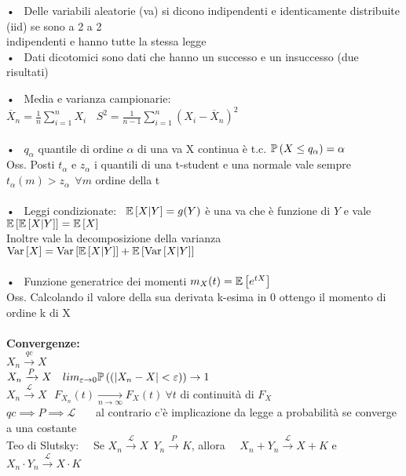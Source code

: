 

• \ Delle variabili aleatorie (va) si dicono indipendenti e identicamente distribuite (iid) se sono a 2 a 2\\ indipendenti e hanno tutte la stessa legge\\

• \ Dati dicotomici sono dati che hanno un successo e un insuccesso (due risultati)\\




• \ Media e varianza campionarie: \ \ $\overline{X}_n=\frac{1}{n} \displaystyle \sum_{i=1}^n X_i \ \ \ \ S^2=\frac{1}{n-1}\sum_{i=1}^n(X_i-\overline{X}_n)^2$\\ \\

• \ $q_{\alpha}$ quantile di ordine $\alpha$ di una va X continua è t.c. $\mathbb{P} \left( X\le q_{\alpha} \right)=\alpha$\\
Oss. Posti $t_{\alpha}$ e $z_{\alpha}$ i quantili di una t-student e una normale vale sempre \  $t_{\alpha}(m)>z_{\alpha}\ \ \forall m$ ordine della t\\ \\

• \ Leggi condizionate: \ $\mathbb{E} \left[ X|Y \right]=g(Y)$ è una va che è funzione di $Y$ e vale $\mathbb{E} \left[ \mathbb{E} \left[ X|Y \right] \right]=\mathbb{E} \left[ X \right]$\\
Inoltre vale la decomposizione della varianza $\text{Var} \left[ X \right]=\text{Var} \left[ \mathbb{E} \left[ X|Y \right] \right]+\mathbb{E} \left[ \text{Var} \left[ X|Y \right] \right]$\\ \\

• \ Funzione generatrice dei momenti $m_X(t)=\mathbb{E} \left[ e^{tX} \right]$\\
Oss. Calcolando il valore della sua derivata k-esima in 0 ottengo il momento di ordine k di X\\ \\

\textbf{Convergenze:}\\
$X_n\xrightarrow{qc} X$\\
$X_n\xrightarrow{P}X \ \ \ lim_{\varepsilon \to 0} \mathbb{P} \left( (|X_n-X|<\varepsilon) \right)\to 1$\\
$X_n\xrightarrow{\mathcal{L}}X \ \ \ F_{X_n}(t)\xrightarrow[n\to\infty]{} F_X(t) \ \forall t$ di continuità di $F_X$\\
$qc \implies P \implies \mathcal{L}$ \ \ \ al contrario c'è implicazione da legge a probabilità se converge a una costante\\

Teo di Slutsky: \ \ Se $X_n\xrightarrow{\mathcal{L}}X \ \ Y_n\xrightarrow{P}K$, allora \ \ $X_n + Y_n \xrightarrow{\mathcal{L}}X+K$ e \ \ $X_n\cdot Y_n\xrightarrow{\mathcal{L}}X\cdot K$\\ \\

